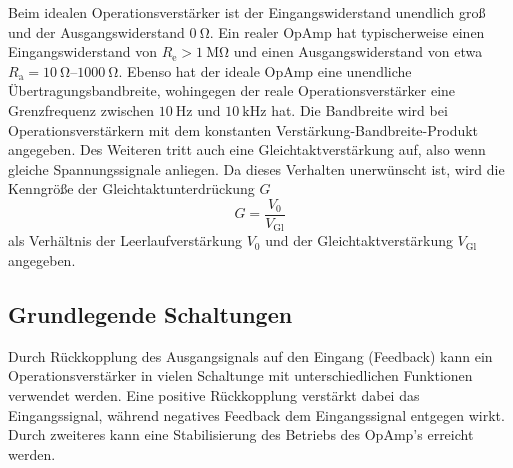Beim idealen Operationsverstärker ist der Eingangswiderstand unendlich groß und der Ausgangswiderstand $\qty{0}{\ohm}$. Ein realer OpAmp hat typischerweise einen Eingangswiderstand
von $R_\text{e} > \qty{1}{\mega\ohm}$ und einen Ausgangswiderstand von etwa $R_\text{a} = \qtyrange[range-phrase = -]{10}{1000}{\ohm}$.
Ebenso hat der ideale OpAmp eine unendliche Übertragungsbandbreite, wohingegen der reale Operationsverstärker eine Grenzfrequenz zwischen $\qty{10}{\hertz}$ und 
$\qty{10}{\kilo\hertz}$ hat. Die Bandbreite wird bei Operationsverstärkern mit dem konstanten Verstärkung-Bandbreite-Produkt angegeben.
Des Weiteren tritt auch eine Gleichtaktverstärkung auf, also wenn gleiche Spannungssignale anliegen. Da dieses Verhalten unerwünscht ist, wird die Kenngröße der 
Gleichtaktunterdrückung $G$
\begin{equation}
    G = \frac{V_0}{V_\text{Gl}}
    \label{eq:Gleichtakt}
\end{equation}
als Verhältnis der Leerlaufverstärkung $V_0$ und der Gleichtaktverstärkung $V_\text{Gl}$ angegeben.

\subsection{Grundlegende Schaltungen}
Durch Rückkopplung des Ausgangsignals auf den Eingang (Feedback) kann ein Operationsverstärker in vielen Schaltunge mit unterschiedlichen Funktionen verwendet werden.
Eine positive Rückkopplung verstärkt dabei das Eingangssignal, während negatives Feedback dem Eingangssignal entgegen wirkt.
Durch zweiteres kann eine Stabilisierung des Betriebs des OpAmp's erreicht werden.

